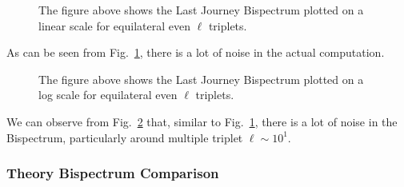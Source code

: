 \documentclass[11pt]{article}
\renewcommand{\_}[1]{\underline{ #1 }}
\begin{document}
{\begin{figure}[H]
    \centering
    \caption{The figure above shows the Last Journey Bispectrum plotted on a linear scale for equilateral even $\ell$ triplets.}\label{fig:initial_LJ_bispec_linear}
\end{figure}

As can be seen from Fig.~\ref{fig:initial_LJ_bispec_linear}, there is a lot of noise in the actual computation.

\begin{figure}[H]
    \centering
    \caption{The figure above shows the Last Journey Bispectrum plotted on a log scale for equilateral even $\ell$ triplets.}\label{fig:initial_LJ_bispec_log}
\end{figure}

We can observe from Fig.~\ref{fig:initial_LJ_bispec_log} that, similar to Fig.~\ref{fig:initial_LJ_bispec_linear}, there is a lot of noise in the Bispectrum, particularly around multiple triplet $\ell \sim 10^1$.

\subsubsection{Theory Bispectrum Comparison}\label{theorybispecplots}

}
\end{document}
